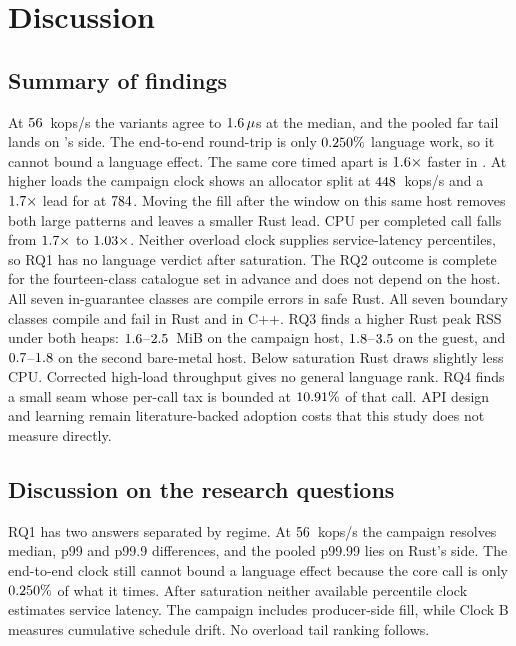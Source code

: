 \documentclass[english,oneside,a4paper,censored,csm,software-track-2020]{HYthesisML}
\begin{document}
\chapter{Discussion\label{chapter:discussion}}

\section{Summary of findings}
At $56$~kops/s the variants agree to
$1.6\,\mu$s at the median, and the pooled far tail lands on
\FarTailLower{}'s side. The end-to-end round-trip is only
$0.250\%$ language work, so it cannot bound a language effect.
The same core timed apart is $1.6\times$ faster in
\BudgetCoreFaster{}. At higher loads the campaign clock shows an allocator
split at $448$~kops/s and a $1.7\times$ lead for
\OverloadSustainedFaster{} at $784$. Moving the fill after the
window on this same host removes both large patterns and leaves a smaller
Rust lead. CPU per completed call falls from $1.7\times$
to $1.03\times$. Neither overload clock supplies
service-latency percentiles, so RQ1 has no language verdict after saturation. The RQ2 outcome
is complete for the fourteen-class catalogue set in advance and does not
depend on the host. All seven in-guarantee classes are
compile errors in safe Rust. All seven boundary classes compile and
fail in Rust and in C++. RQ3 finds a higher Rust peak RSS under both heaps:
$1.6$--$2.5$~MiB on the campaign host,
$1.8$--$3.5$ on the guest, and
$0.7$--$1.8$ on the second bare-metal host. Below
saturation Rust draws slightly less CPU. Corrected high-load throughput gives
no general language rank. RQ4 finds a small seam whose per-call tax is bounded
at $10.91\%$ of that call. API design and learning remain
literature-backed adoption costs that this study does not measure directly.

\section{Discussion on the research questions}\label{sec:rqdiscussion}
RQ1 has two answers separated by regime. At $56$~kops/s the campaign
resolves median, p99 and p99.9 differences, and the pooled p99.99 lies on
Rust's side. The end-to-end clock still cannot bound a language effect because
the core call is only $0.250\%$ of what it times. After
saturation neither available percentile clock estimates service latency. The
campaign includes producer-side fill, while Clock B measures cumulative
schedule drift. No overload tail ranking follows.
\end{document}
